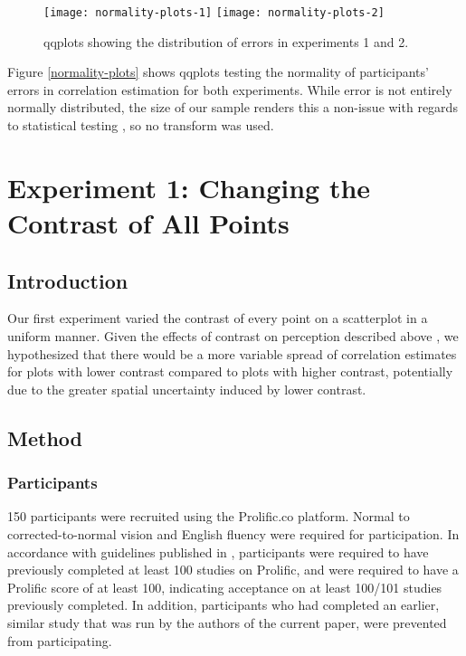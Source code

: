 \documentclass[preprint, 3p,
authoryear]{elsarticle} %
\begin{document}
\begin{figure}

\texttt{[image: normality-plots-1]} \texttt{[image: normality-plots-2]} \hfill{}

\caption{\label{normality-plots}qqplots showing the distribution of errors in experiments 1 and 2.}\label{fig:normality-plots}
\end{figure}

Figure \ref{normality-plots} shows qqplots testing the normality of
participants' errors in correlation estimation for both experiments.
While error is not entirely normally distributed, the size of our sample
renders this a non-issue with regards to statistical testing
\citep{ghasemi_2012}, so no transform was used.

\hypertarget{experiment-1-changing-the-contrast-of-all-points}{%
\section{Experiment 1: Changing the Contrast of All
Points}\label{experiment-1-changing-the-contrast-of-all-points}}

\hypertarget{introduction-1}{%
\subsection{Introduction}\label{introduction-1}}

Our first experiment varied the contrast of every point on a scatterplot
in a uniform manner. Given the effects of contrast on perception
described above \citep{champion_2017, wehrhahn_1990}, we hypothesized
that there would be a more variable spread of correlation estimates for
plots with lower contrast compared to plots with higher contrast,
potentially due to the greater spatial uncertainty induced by lower
contrast.

\hypertarget{method}{%
\subsection{Method}\label{method}}

\hypertarget{participants}{%
\subsubsection{Participants}\label{participants}}

150 participants were recruited using the Prolific.co platform. Normal
to corrected-to-normal vision and English fluency were required for
participation. In accordance with guidelines published in
\citet{peer_2021}, participants were required to have previously
completed at least 100 studies on Prolific, and were required to have a
Prolific score of at least 100, indicating acceptance on at least
100/101 studies previously completed. In addition, participants who had
completed an earlier, similar study that was run by the authors of the
current paper, were prevented from participating.
\end{document}
